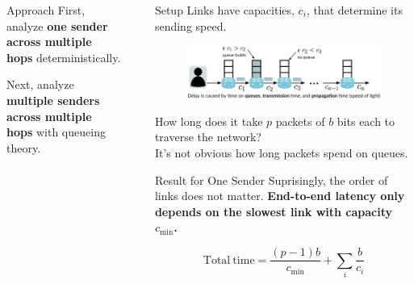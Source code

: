 \documentclass[final]{beamer}
\newlength{\sepwidth}
\newlength{\colwidth}
\newcommand{\separatorcolumn}{\begin{column}{\sepwidth}\end{column}}
\begin{document}
\begin{frame}[t]
\begin{columns}[t]
\begin{column}{\colwidth}
  \begin{block}{Approach}
    \vspace{-5mm}
    First, analyze \textbf{one sender across multiple hops} deterministically.
    
    Next, analyze \textbf{multiple senders across multiple hops} with queueing theory.
  \end{block}
\end{column}

\separatorcolumn

\begin{column}{\colwidth}
  {\LARGE{}}

  \begin{block}{Setup}
    \vspace{-7mm}
    Links have capacities, $c_i$, that determine its sending speed.
    \begin{center}
      \begin{figure}
        \includegraphics[scale=.9]{images/onesender.png}
      \end{figure}
    \end{center}
    
    How long does it take $p$ packets of $b$ bits each to traverse the network?\\
    It's not obvious how long packets spend on queues.
  \end{block}
  \vspace{-7mm}

  \begin{block}{Result for One Sender}
    \vspace{-7mm}
    Suprisingly, the order of links does not matter. 
    \textbf{End-to-end latency only depends on the slowest link with capacity $c_\mathrm{min}$.}

      \[\mathrm{Total \ time} = \frac{(p-1)b}{c_\mathrm{min}} + \sum_i \frac{b}{c_i}\]
  \end{block}


\end{column}
\end{columns}
\end{frame}
\end{document}
